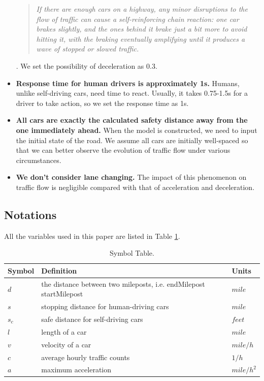 \documentclass[a4paper]{article}
\begin{document}
\begin{itemize}
{			\begin{quote}\textit{If there are enough cars on a highway, any minor disruptions to the flow of traffic can cause a self-reinforcing chain reaction: one car brakes slightly, and the ones behind it brake just a bit more to avoid hitting it, with the braking eventually amplifying until it produces a wave of stopped or slowed traffic.}\cite{phantom}\end{quote}}. We set the possibility of deceleration as 0.3.
		\item \textbf{Response time for human drivers is approximately 1s.} Humans, unlike self-driving cars, need time to react. Usually, it takes 0.75-1.5s for a driver to take action, so we set the response time as 1s.
		\item \textbf{All cars are exactly the calculated safety distance away from the one immediately ahead.} When the model is constructed, we need to input the initial state of the road. We assume all cars are initially well-spaced so that we can better observe the evolution of traffic flow under various circumstances. 
		\item \textbf{We don’t consider lane changing.} The impact of this phenomenon on traffic flow is negligible compared with that of acceleration and deceleration. 
	\end{itemize}
	
	
	\subsection{Notations}
	All the variables used in this paper are listed in Table \ref{t1}.
	
	\begin{table}[H]
		\centering
		\begin{tabular}{lll}
			\toprule
			Symbol & Definition & Units \\
			\midrule
			$ d $     & the distance between two mileposts, i.e. endMilepost startMilepost & $mile$ \\
			$ s $     & stopping distance for human-driving cars & $mile$ \\
			$ s_c $ & safe distance for self-driving cars & $feet$\\
			$ l $     & length of a car & $mile$ \\
			$ v $     & velocity of a car & $mile/h$ \\
			$ c $     & average hourly traffic counts & $1/h$ \\
			$ a $     & maximum acceleration & $mile/h^2$ \\
			\bottomrule
		\end{tabular}
		\caption{Symbol Table.}
		\label{t1}
	\end{table}
	
\end{document}
